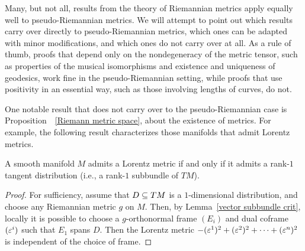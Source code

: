 Many, but not all, results from the theory of Riemannian metrics apply 
equally well to pseudo-Riemannian metrics. We will attempt to point out 
which results carry over directly to pseudo-Riemannian metrics, which ones 
can be adapted with minor modifications, and which ones do not carry over 
at all. As a rule of thumb, proofs that depend only on the nondegeneracy of 
the metric tensor, such as properties of the musical isomorphisms and 
existence and uniqueness of geodesics, work fine in the pseudo-Riemannian 
setting, while proofs that use positivity in an essential way, such as 
those involving lengths of curves, do not.\par
One notable result that does not carry over to the pseudo-Riemannian case 
is Proposition~~\ref{Riemann metric space}, about the existence of metrics. 
For example, the following result characterizes those manifolds that admit 
Lorentz metrics.
\begin{theorem}\label{Riemann Lorenta metric}
A smooth manifold $M$ admits a Lorentz metric if and only if it admits a 
rank-$1$ tangent distribution (i.e., a rank-$1$ subbundle of $TM$).
\end{theorem}
\begin{proof}
For sufficiency, assume that $D\subseteq TM$ is a $1$-dimensional distribution, 
and choose any Riemannian metric $g$ on $M$. Then, by Lemma~\ref{vector subbundle crit}, 
locally it is possible to choose a $g$-orthonormal frame $(E_i)$ and dual 
coframe $(\varepsilon^i)$ such that $E_1$ spans $D$. Then the Lorentz metric 
$-(\varepsilon^1)^2+(\varepsilon^2)^2+\cdots+(\varepsilon^n)^2$ is independent of the choice of 
frame.
\end{proof}
